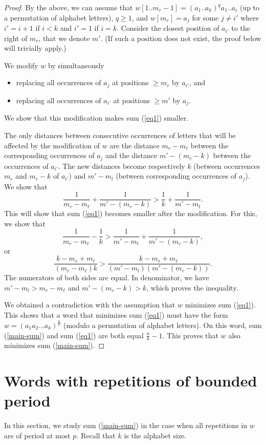 \documentclass[11pt]{article}
\def\paren#1{\left( #1 \right)}
\begin{document}
\begin{proof}
By the above, we can assume that 
$w[1..m_r-1]=(a_1..a_k)^qa_1..a_i$ (up to a permutation of alphabet
letters), $q\geq 1$, and 
$w[m_r]=a_j$ for some
$j\neq i'$ where $i'=i+1$ if $i<k$ and $i'=1$ if $i=k$. 
Consider the
closest position of $a_{i'}$ to the right of $m_r$, that we denote
$m'$. (If such a position does not exist, the proof below will
trivially apply.) 

We modify $w$ by simultaneously
\begin{itemize}
\item replacing all occurrences of $a_j$ at positions $\geq m_r$ by
  $a_{i'}$, and
\item replacing all occurrences of $a_{i'}$ at positions $\geq m'$ by
  $a_{j}$.
\end{itemize}
We show that this modification makes sum (\ref{eq1}) smaller. 


The only distances between consecutive occurrences of letters that
will be affected by the modification of $w$ are the distance
$m_r-m_\ell$ between the corresponding occurrences of $a_j$ and the
distance $m'-(m_r-k)$ between the occurrences of $a_{i'}$. The new
distances become respectively $k$ (between occurrences $m_r$ and $m_r-k$ of $a_{i'}$) and
$m'-m_l$ (between corresponding occurrences of $a_j$). We show that 
\[
\frac{1}{m_r-m_\ell}+\frac{1}{m'-(m_r-k)}>\frac{1}{k}+\frac{1}{m'-m_l}.\]
This will show that sum (\ref{eq1}) becomes
smaller after the modification. For this, we show that 
\[
\frac{1}{m_r-m_\ell}-\frac{1}{k}>\frac{1}{m'-m_l}+\frac{1}{m'-(m_r-k)},\]
or
\[\frac{k-m_r+m_\ell}{(m_r-m_\ell)k}>\frac{k-m_r+m_\ell}{(m'-m_l)(m'-(m_r-k))}.\]
The numerators of both sides are equal. In denominator, we have
$m'-m_l>m_r-m_\ell$ and $m'-(m_r-k)>k$, which proves the inequality. 

We obtained a contradiction with the assumption that $w$ minimizes sum
(\ref{eq1}). This shows that a word that minimizes sum (\ref{eq1})
must have the form $w=\paren{a_1 a_2 \ldots a_k}^{\frac{n}{k}}$ (modulo a
permutation of alphabet letters). On this word, sum (\ref{main-sum})
and sum (\ref{eq1}) are both equal $\frac{n}{k}-1$. This proves that
$w$ also minimizes sum (\ref{main-sum}). 
\end{proof}

\section{Words with repetitions of bounded period}
\label{boundedp}

In this section, we study sum (\ref{main-sum}) in the case when all
repetitions in $w$ are of period at most $p$. Recall that $k$ is the
alphabet size. 
\end{document}
